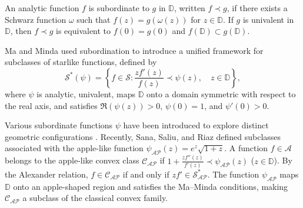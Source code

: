 \documentclass[11pt]{article}
\numberwithin{equation}{section}
\begin{document}
An analytic function $f$ is subordinate to $g$ in $\mathbb{D}$, written $f\prec g$, if there exists a Schwarz function $\omega$ such that $f(z)=g(\omega(z))$ for $z\in\mathbb{D}$. If $g$ is univalent in $\mathbb{D}$, then $f\prec g$ is equivalent to $f(0)=g(0)$ and $f(\mathbb{D})\subset g(\mathbb{D})$.

Ma and Minda \cite{MM} used subordination to introduce a unified framework for subclasses of starlike functions, defined by
\[
\mathcal{S}^{\ast}(\psi) = \left\{ f\in\mathcal{S}: \frac{zf'(z)}{f(z)} \prec \psi(z), \quad z\in\mathbb{D}\right\},
\]
where $\psi$ is analytic, univalent, maps $\mathbb{D}$ onto a domain symmetric with respect to the real axis, and satisfies $\Re(\psi(z))>0$, $\psi(0)=1$, and $\psi'(0)>0$.

Various subordinate functions $\psi$ have been introduced to explore distinct geometric configurations \cite{MM, Ravichandran2015, RavichandranVerma2017}. Recently, Sana, Saliu, and Riaz \cite{SanaSaliuRiaz} defined subclasses associated with the apple-like function $\psi_{\mathcal{AP}}(z)=e^{z}\sqrt{1+z}$. A function $f\in\mathcal{A}$ belongs to the apple-like convex class $\mathcal{C}_{\mathcal{AP}}$ if $1+\frac{zf''(z)}{f'(z)}\prec \psi_{\mathcal{AP}}(z)$ ($z\in\mathbb{D}$). By the Alexander relation, $f\in\mathcal{C}_{\mathcal{AP}}$ if and only if $zf'\in\mathcal{S}_{\mathcal{AP}}^{\ast}$. The function $\psi_{\mathcal{AP}}$ maps $\mathbb{D}$ onto an apple-shaped region and satisfies the Ma--Minda conditions, making $\mathcal{C}_{\mathcal{AP}}$ a subclass of the classical convex family.
\end{document}
